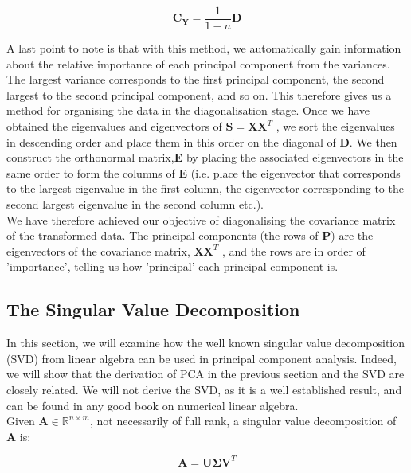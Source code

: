 \documentclass[12pt]{article}
\theoremstyle{plain}
\begin{document}
\begin{equation}
\textbf{C}_{\textbf{Y}} =  \frac{1}{1-n}\textbf{D}
\end{equation}


A last point to note is that with this method, we automatically gain information about the relative importance of each principal component from the variances. The largest variance corresponds to the first principal component, the second largest to the second principal component, and so on. This therefore gives us a method for organising the data in the diagonalisation stage. Once we have obtained the eigenvalues and eigenvectors of  $\textbf{S} = \textbf{XX}^T$ , we sort the eigenvalues in descending order and place them in this order on the diagonal of \textbf{D}. We then construct the orthonormal matrix,\textbf{E} by placing the associated eigenvectors in the same order to form the columns of \textbf{E} (i.e. place the eigenvector that corresponds to the largest eigenvalue in the first column, the eigenvector corresponding to the second largest eigenvalue in the second column etc.).
\\

We have therefore achieved our objective of diagonalising the covariance matrix of the transformed data. The principal components (the rows of \textbf{P}) are the eigenvectors of the covariance matrix, $\textbf{XX}^T$ , and the rows are in order of 'importance', telling us how 'principal' each principal component is.

\subsection{The Singular Value Decomposition}

In this section, we will examine how the well known singular value decomposition (SVD) from linear algebra can be used in principal component analysis. Indeed, we will show that the derivation of PCA in the previous section and the SVD are closely related. We will not derive the SVD, as it is a well established result, and can be found in any good book on numerical linear algebra.
\\

Given $\textbf{A} \in \mathbb{R}^{n\times m}$, not necessarily of full rank, a singular value decomposition of \textbf{A} is:

\begin{equation}
\textbf{A} =\textbf{U}\mathbf{\Sigma}\textbf{V}^T
\end{equation}
\end{document}
